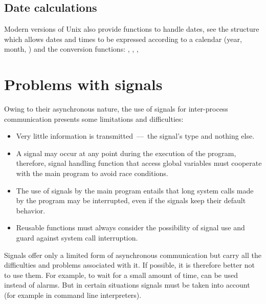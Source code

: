 \subsection*{Date calculations}

Modern versions of Unix also provide functions to handle dates, see
the structure  which allows dates and times to be
expressed according to a calendar (year, month, \etc) and the
conversion functions: ,
, , \etc

\section{Problems with signals}

Owing to their asynchronous nature, the use of signals for inter-process communication 
presents some limitations and difficulties:
%
\begin{itemize}

\item Very little information is transmitted~---~the signal's
type and nothing else.

\item A signal may occur at any point during the execution of the
  program, therefore, signal handling function that access global
  variables must cooperate with the main program to avoid race
  conditions. 

\item The use of signals by the main program entails that long system
  calls made by the program may be interrupted, even if the signals
  keep their default behavior.

\item Reusable functions must always consider the possibility of
  signal use and guard against system call interruption.

\end{itemize}
%

Signals offer only a limited form of asynchronous communication but
carry all the difficulties and problems associated with it. If possible,
it is therefore better not to use them. For example, to wait for a small
amount of time,  can be used instead of alarms. But
in certain situations signals must be taken into account (for example in
command line interpreters).

